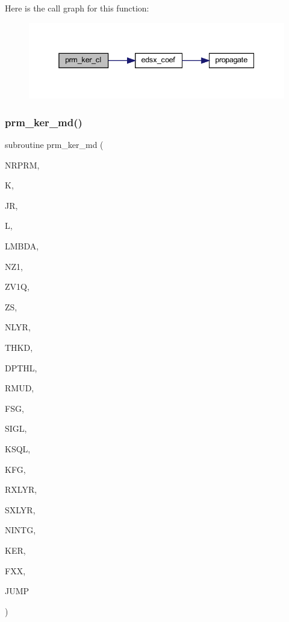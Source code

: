Here is the call graph for this function\+:\nopagebreak
\begin{figure}[H]
\begin{center}
\leavevmode
\includegraphics[width=338pt]{Leroi__c_8f90_a04185f4ba85efc3e493f2de9019a69da_cgraph}
\end{center}
\end{figure}
\mbox{\label{Leroi__c_8f90_a54994b19439ad9ea5bfc96a902101c44}} 
\subsubsection{\texorpdfstring{prm\+\_\+ker\+\_\+md()}{prm\_ker\_md()}}
{\footnotesize\ttfamily subroutine prm\+\_\+ker\+\_\+md (\begin{DoxyParamCaption}\item[{integer}]{N\+R\+P\+RM,  }\item[{integer}]{K,  }\item[{integer}]{JR,  }\item[{integer}]{L,  }\item[{real(kind=ql)}]{L\+M\+B\+DA,  }\item[{integer}]{N\+Z1,  }\item[{real(kind=ql), dimension(nz1)}]{Z\+V1Q,  }\item[{real(kind=ql)}]{ZS,  }\item[{integer}]{N\+L\+YR,  }\item[{real(kind=ql), dimension (nlyr)}]{T\+H\+KD,  }\item[{real(kind=ql), dimension (nlyr)}]{D\+P\+T\+HL,  }\item[{real(kind=ql), dimension(0\+:nlyr)}]{R\+M\+UD,  }\item[{complex (kind=ql)}]{F\+SG,  }\item[{complex(kind=ql), dimension (nlyr)}]{S\+I\+GL,  }\item[{complex(kind=ql), dimension (nlyr)}]{K\+S\+QL,  }\item[{integer}]{K\+FG,  }\item[{integer}]{R\+X\+L\+YR,  }\item[{integer}]{S\+X\+L\+YR,  }\item[{integer}]{N\+I\+N\+TG,  }\item[{complex (kind=ql), dimension(jnlo-\/nrprm\+:jnhi,5,nz1)}]{K\+ER,  }\item[{complex (kind=ql), dimension(nrprm,5,nz1)}]{F\+XX,  }\item[{logical}]{J\+U\+MP }\end{DoxyParamCaption})}

